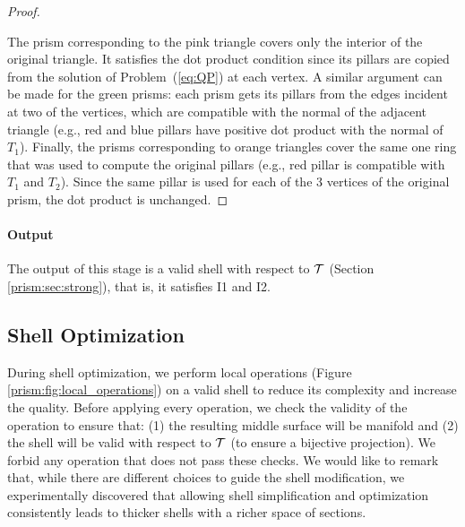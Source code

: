 \begin{proof}
\begin{figure}
    \label{prism:fig:bevel-explain}
    \vspace{-1em}
\end{figure}
The prism {corresponding to} the {pink} triangle covers only the interior of the original triangle. It satisfies {the dot product condition} since {its pillars are copied from the solution of Problem~(\ref{eq:QP})} at each vertex. 
A similar argument can be made for the green {prisms}: each  {prism} 
{gets its pillars from the edges}
incident at two of the vertices, {which are compatible with the normal of the adjacent triangle (e.g., red and blue pillars have positive dot product with  {the normal of} $T_1$).}
Finally, the prisms corresponding to orange triangles cover the same one ring that was used to compute the {original pillars (e.g., red pillar is compatible with $T_1$ and $T_2$)}. Since the same {pillar} is used for  each of the 3 vertices of the original prism, {the dot product} is {unchanged}.

\end{proof}


\paragraph{Output}
The output of this stage is a valid shell with respect to $\mathcal{T}$ (Section \ref{prism:sec:strong}), that is, it satisfies I1 and I2.


\subsection{Shell Optimization}
\label{prism:sec:optimization}

During shell optimization, we perform local operations
(Figure \ref{prism:fig:local_operations})
on a valid shell to reduce its complexity and increase the quality. Before applying every operation, we check the validity of the operation to ensure that: (1) the resulting middle surface will be manifold \cite{dey1999topology} and (2) the shell will be valid with respect to $\mathcal{T}$ (to ensure a bijective projection). We forbid any operation that does not pass these checks.  
{We would like to remark that, 
while there are different choices to guide the shell modification, we
experimentally discovered that allowing shell simplification and optimization consistently leads to thicker shells with a richer space of sections.} 

